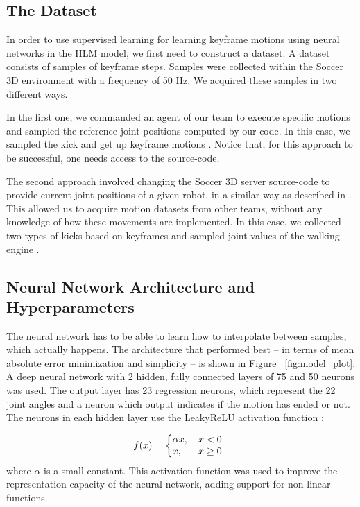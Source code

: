 \subsection{The Dataset}\label{AA}
In order to use supervised learning for learning keyframe motions using neural networks in the HLM model, we first need to construct a dataset. A dataset consists of samples of keyframe steps. Samples were collected within the Soccer 3D environment with a frequency of 50 Hz. We acquired these samples in two different ways.

In the first one, we commanded an agent of our team to execute specific motions and sampled the reference joint positions computed by our code. In this case, we sampled the kick and get up keyframe motions \cite{muniz2016}. Notice that, for this approach to be successful, one needs access to the source-code.

The second approach involved changing the Soccer 3D server source-code to provide current joint positions of a given robot, in a similar way as described in \cite{macalpine2013}. This allowed us to acquire motion datasets from other teams, without any knowledge of how these movements are implemented. In this case, we collected two types of kicks based on keyframes and sampled joint values of the walking engine \cite{AAAI12-MacAlpine}.


\subsection{Neural Network Architecture and Hyperparameters}

The neural network has to be able to learn how to interpolate between samples, which actually happens. The architecture that performed best -- in terms of mean absolute error minimization and simplicity -- is shown in Figure ~\ref{fig:model_plot}. A deep neural network with 2 hidden, fully connected layers of 75 and 50 neurons was used. The output layer has 23 regression neurons, which represent the 22 joint angles and a neuron which output indicates if the motion has ended or not. The neurons in each hidden layer use the LeakyReLU activation function \cite{leakyrelu}: 

\[
  f(x) = \left\{
     \begin{array}{@{}l@{\thinspace}l}
       \alpha x,   & \quad x < 0  \\
       x, & \quad x \ge0 \\
     \end{array}
   \right.
\]
where $\alpha$ is a small constant. This activation function was used to improve the representation capacity of the neural network, adding support for non-linear functions.

